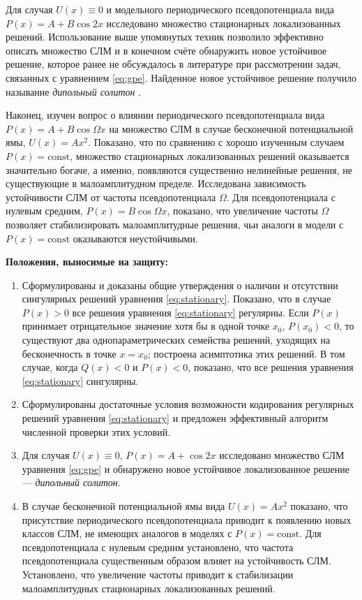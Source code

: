 \documentclass[candidate, href, colorlinks]{disser}
\begin{document}
Для случая $U(x) \equiv 0$ и модельного периодического псевдопотенциала вида $P(x) = A + B \cos 2x$ исследовано множество стационарных локализованных решений.
Использование выше упомянутых техник позволило эффективно описать множество СЛМ и в конечном счёте обнаружить новое устойчивое решение, которое ранее не обсуждалось в литературе при рассмотрении задач, связанных с уравнением \eqref{eq:gpe}.
Найденное новое устойчивое решение получило называние {\it дипольный солитон} \cite{LebedevAlfimovMalomed}.

Наконец, изучен вопрос о влиянии периодического псевдопотенциала вида $P(x) = A + B \cos \Omega x$ на множество СЛМ в случае бесконечной потенциальной ямы, $U(x) = A x^2$.
Показано, что по сравнению с хорошо изученным случаем $P(x) = \mathrm{const}$, множество стационарных локализованных решений оказывается значительно богаче, а именно, появляются существенно нелинейные решения, не существующие в малоамплитудном пределе.
Исследована зависимость устойчивости СЛМ от частоты псевдопотенциала $\Omega$.
Для псевдопотенциала с нулевым средним, $P(x) = B \cos \Omega x$, показано, что увеличение частоты $\Omega$ позволяет стабилизировать малоамплитудные решения, чьи аналоги в модели с $P(x) = \mathrm{const}$ оказываются неустойчивыми.


\textbf{Положения, выносимые на защиту:}
\begin{enumerate}
	\item Сформулированы и доказаны общие утверждения о наличии и отсутствии сингулярных решений уравнения \eqref{eq:stationary}.
		Показано, что в случае $P(x) > 0$ все решения уравнения \eqref{eq:stationary} регулярны.
		Если $P(x)$ принимает отрицательное значение хотя бы в одной точке $x_0$, $P(x_0) < 0$, то существуют два однопараметрических семейства решений, уходящих на бесконечность в точке $x = x_0$; построена асимптотика этих решений. 
		В том случае, когда $Q(x) < 0$ и $P(x) < 0$, показано, что все решения уравнения \eqref{eq:stationary} сингулярны.
	\item Сформулированы достаточные условия возможности кодирования регулярных решений уравнения \eqref{eq:stationary} и предложен эффективный алгоритм численной проверки этих условий.
	\item Для случая $U(x) \equiv 0$, $P(x) = A + \cos 2x$ исследовано множество СЛМ уравнения \eqref{eq:gpe} и обнаружено новое устойчивое локализованное решение --- {\it дипольный солитон}.
	\item В случае бесконечной потенциальной ямы вида $U(x) = A x^2$ показано, что присутствие периодического псевдопотенциала приводит к появлению новых классов СЛМ, не имеющих аналогов в моделях с $P(x) = \mathrm{const}$.
		Для псевдопотенциала с нулевым средним установлено, что частота псевдопотенциала существенным образом влияет на устойчивость СЛМ.
		Установлено, что увеличение частоты приводит к стабилизации малоамплитудных стационарных локализованных решений.
\end{enumerate}
\end{document}
